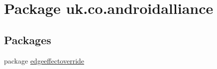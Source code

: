 \hypertarget{namespaceuk_1_1co_1_1androidalliance}{}\section{Package uk.\+co.\+androidalliance}
\label{namespaceuk_1_1co_1_1androidalliance}
\subsection*{Packages}
\begin{DoxyCompactItemize}
\item 
package \hyperlink{namespaceuk_1_1co_1_1androidalliance_1_1edgeeffectoverride}{edgeeffectoverride}
\end{DoxyCompactItemize}
